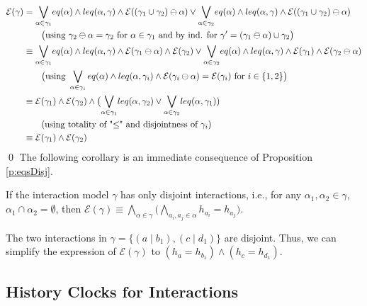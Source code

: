 \documentclass{LMCS}
\newcommand{\mor}[1]{\displaystyle{\bigvee_{#1}}}
\newcommand{\eqs}{\mathcal{E}}
\theoremstyle{plain}\newtheorem{remark}[thm]{Remark}
\theoremstyle{plain}\newtheorem{example}[thm]{Example}
\begin{document}
\begin{align*}
\eqs(\gamma) 
 & = \displaystyle{\bigvee_{\alpha \in \gamma_1}}eq(\alpha) \wedge leq(\alpha,\gamma) \wedge \eqs((\gamma_1 \cup \gamma_2) \ominus \alpha) \vee 
     \displaystyle{\bigvee_{\alpha \in \gamma_2}}eq(\alpha) \wedge leq(\alpha,\gamma) \wedge \eqs((\gamma_1 \cup \gamma_2) \ominus \alpha) \\
 & \qquad \big(\textup{using }  \gamma_2 \ominus \alpha = \gamma_2 \textup{ for } \alpha \in \gamma_1 \textup{ and by ind. for } \gamma' = (\gamma_1 \ominus \alpha) \cup \gamma_2 \big)\\
 & \equiv \displaystyle{\bigvee_{\alpha \in \gamma_1}}eq(\alpha) \wedge leq(\alpha,\gamma) \wedge \eqs(\gamma_1 \ominus \alpha) \wedge \eqs(\gamma_2) \vee 
     \displaystyle{\bigvee_{\alpha \in \gamma_2}}eq(\alpha) \wedge leq(\alpha,\gamma) \wedge \eqs(\gamma_1) \wedge \eqs(\gamma_2 \ominus \alpha) \\
 & \qquad \big(\textup{using } \bigvee_{\alpha \in \gamma_i} eq(\alpha) \wedge leq(\alpha, \gamma_i) \wedge \eqs(\gamma_i \ominus \alpha) = \eqs(\gamma_i) \textup{ for } i \in \{1, 2\} \big) \\
 & \equiv \eqs(\gamma_1) \wedge \eqs(\gamma_2) \wedge \big(\mor{\alpha \in \gamma_1}leq(\alpha, \gamma_2) \vee \mor{\alpha \in \gamma_2}leq(\alpha, \gamma_1)) \qquad \\
 & \qquad (\textup{using totality of "$\leq$" and disjointness of $\gamma_i$})\\
 & \equiv \eqs(\gamma_1) \wedge \eqs(\gamma_2) 
\end{align*}
\vspace*{-.7cm}
\qed
The following corollary is an immediate consequence of Proposition \ref{p:eqsDisj}.
\begin{cor}
 \label{cor:eqsDisj}
If the interaction model $\gamma$ has only
  disjoint interactions, i.e., for any $\alpha_1, \alpha_2 \in
  \gamma$, $\alpha_1 \cap \alpha_2 = \emptyset$, then
  $\eqs(\gamma) \equiv \displaystyle{\bigwedge_{\alpha \in
      \gamma}}\Big(\displaystyle{\bigwedge_{a_i,a_j \in \alpha}} h_{a_i} =h_{a_j}\Big)$.
\end{cor}
The two interactions in $\gamma = \{(a\mid b_1), (c\mid d_1)\}$ are
disjoint. Thus, we can simplify the expression of $\eqs(\gamma)$ to $(h_{a}
= h_{b_1}) \wedge (h_{c}=h_{d_1})$.




\subsection{History Clocks for Interactions}
\label{sec:methodEx}
\end{document}
